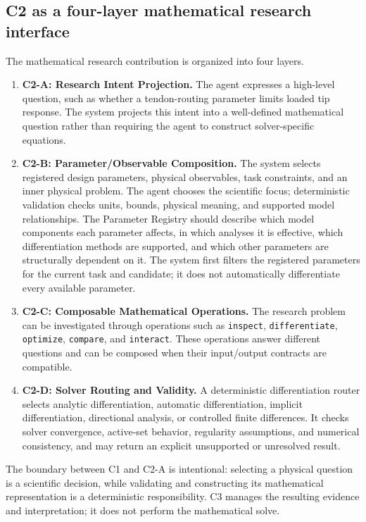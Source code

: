 \subsection{C2 as a four-layer mathematical research interface}

The mathematical research contribution is organized into four layers.

\begin{enumerate}
  \item \textbf{C2-A: Research Intent Projection.} The agent expresses a high-level question, such as whether a tendon-routing parameter limits loaded tip response. The system projects this intent into a well-defined mathematical question rather than requiring the agent to construct solver-specific equations.
  \item \textbf{C2-B: Parameter/Observable Composition.} The system selects registered design parameters, physical observables, task constraints, and an inner physical problem. The agent chooses the scientific focus; deterministic validation checks units, bounds, physical meaning, and supported model relationships. The Parameter Registry should describe which model components each parameter affects, in which analyses it is effective, which differentiation methods are supported, and which other parameters are structurally dependent on it. The system first filters the registered parameters for the current task and candidate; it does not automatically differentiate every available parameter.
  \item \textbf{C2-C: Composable Mathematical Operations.} The research problem can be investigated through operations such as \texttt{inspect}, \texttt{differentiate}, \texttt{optimize}, \texttt{compare}, and \texttt{interact}. These operations answer different questions and can be composed when their input/output contracts are compatible.
  \item \textbf{C2-D: Solver Routing and Validity.} A deterministic differentiation router selects analytic differentiation, automatic differentiation, implicit differentiation, directional analysis, or controlled finite differences. It checks solver convergence, active-set behavior, regularity assumptions, and numerical consistency, and may return an explicit unsupported or unresolved result.
\end{enumerate}

The boundary between C1 and C2-A is intentional: selecting a physical question is a scientific decision, while validating and constructing its mathematical representation is a deterministic responsibility. C3 manages the resulting evidence and interpretation; it does not perform the mathematical solve.

